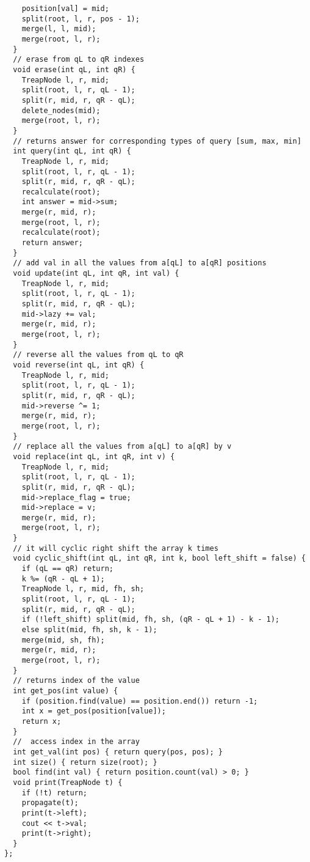 \documentclass[twoside]{article}
\begin{document}
\begin{multicols*}{2}
\begin{verbatim}
    position[val] = mid;
    split(root, l, r, pos - 1);
    merge(l, l, mid);
    merge(root, l, r);
  }
  // erase from qL to qR indexes
  void erase(int qL, int qR) {
    TreapNode l, r, mid;
    split(root, l, r, qL - 1);
    split(r, mid, r, qR - qL);
    delete_nodes(mid);
    merge(root, l, r);
  }
  // returns answer for corresponding types of query [sum, max, min]
  int query(int qL, int qR) {
    TreapNode l, r, mid;
    split(root, l, r, qL - 1);
    split(r, mid, r, qR - qL);
    recalculate(root);
    int answer = mid->sum;
    merge(r, mid, r);
    merge(root, l, r);
    recalculate(root);
    return answer;
  }
  // add val in all the values from a[qL] to a[qR] positions
  void update(int qL, int qR, int val) {
    TreapNode l, r, mid;
    split(root, l, r, qL - 1);
    split(r, mid, r, qR - qL);
    mid->lazy += val;
    merge(r, mid, r);
    merge(root, l, r);
  }
  // reverse all the values from qL to qR
  void reverse(int qL, int qR) {
    TreapNode l, r, mid;
    split(root, l, r, qL - 1);
    split(r, mid, r, qR - qL);
    mid->reverse ^= 1;
    merge(r, mid, r);
    merge(root, l, r);
  }
  // replace all the values from a[qL] to a[qR] by v
  void replace(int qL, int qR, int v) {
    TreapNode l, r, mid;
    split(root, l, r, qL - 1);
    split(r, mid, r, qR - qL);
    mid->replace_flag = true;
    mid->replace = v;
    merge(r, mid, r);
    merge(root, l, r);
  }
  // it will cyclic right shift the array k times
  void cyclic_shift(int qL, int qR, int k, bool left_shift = false) {
    if (qL == qR) return;
    k %= (qR - qL + 1);
    TreapNode l, r, mid, fh, sh;
    split(root, l, r, qL - 1);
    split(r, mid, r, qR - qL);
    if (!left_shift) split(mid, fh, sh, (qR - qL + 1) - k - 1);
    else split(mid, fh, sh, k - 1);
    merge(mid, sh, fh);
    merge(r, mid, r);
    merge(root, l, r);
  }
  // returns index of the value
  int get_pos(int value) {
    if (position.find(value) == position.end()) return -1;
    int x = get_pos(position[value]);
    return x;
  }
  //  access index in the array
  int get_val(int pos) { return query(pos, pos); }
  int size() { return size(root); }
  bool find(int val) { return position.count(val) > 0; }
  void print(TreapNode t) {
    if (!t) return;
    propagate(t);
    print(t->left);
    cout << t->val;
    print(t->right);
  }
};

\end{verbatim}

{
}
\end{multicols*}
\end{document}
